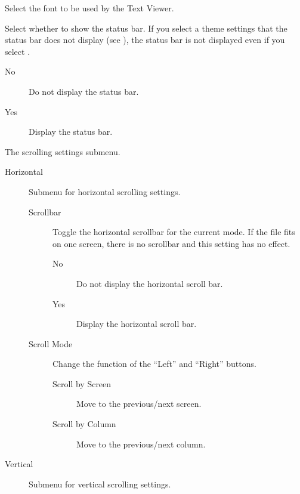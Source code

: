 \begin{description}
\begin{description}
{    \item[Font] Select the font to be used by the Text Viewer.
    \item[Show Statusbar] Select whether to show the status bar. If you select
         a theme settings that the status bar does not display (see
         ), the status bar is not
         displayed even if you select .
        \begin{description}
            \item[No] Do not display the status bar.
            \item[Yes] Display the status bar.
        \end{description}
    }
    \item[Scroll Settings] The scrolling settings submenu.
        \begin{description}
            \item[Horizontal] Submenu for horizontal scrolling settings.
                \begin{description}
                    \item[Scrollbar] Toggle the horizontal scrollbar for the
                    current mode. If the file fits on one screen, there is no
                    scrollbar and this setting has no effect.
                        \begin{description}
                            \item[No] Do not display the horizontal scroll bar.
                            \item[Yes] Display the horizontal scroll bar.
                        \end{description}
                    \item[Scroll Mode] Change the function of the ``Left'' and
    ``Right'' buttons.
                        \begin{description}
                            \item[Scroll by Screen] Move to the previous/next
                            screen.
                            \item[Scroll by Column] Move to the previous/next
                            column.
                        \end{description}
                \end{description}
            \item[Vertical] Submenu for vertical scrolling settings.
                \begin{description}

\end{description}
\end{description}
\end{description}
\end{description}
